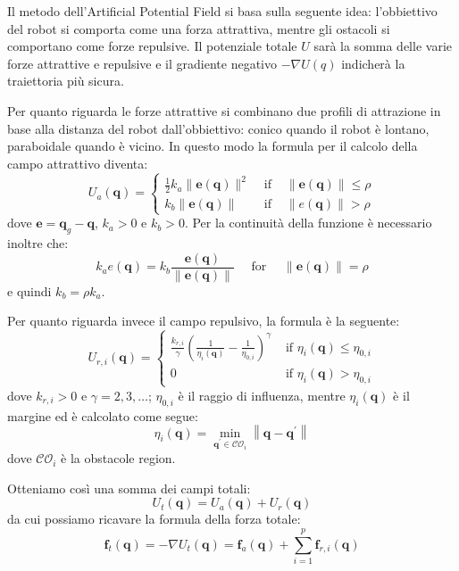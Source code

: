 \documentclass[Lau, binding=0.6cm, oneside]{sapthesis}
\begin{document}
Il metodo dell'Artificial Potential Field si basa sulla seguente idea: l'obbiettivo del robot si comporta come una forza attrattiva, mentre gli ostacoli si comportano come forze repulsive.
Il potenziale totale $U$ sarà la somma delle varie forze attrattive e repulsive e il gradiente negativo $-\nabla U(q)$ indicherà la traiettoria più sicura.

Per quanto riguarda le forze attrattive si combinano due profili di attrazione in base alla distanza del robot dall'obbiettivo: conico quando il robot è lontano, paraboidale quando è vicino.
In questo modo la formula per il calcolo della campo attrattivo diventa:
\newline
$$
U_{a}(\boldsymbol{q})=\left\{\begin{array}{cll}
\frac{1}{2} k_{a}\|\boldsymbol{e}(\boldsymbol{q})\|^{2} & \text { if } & \|\boldsymbol{e}(\boldsymbol{q})\| \leq \rho \\
k_{b}\|\boldsymbol{e}(\boldsymbol{q})\| & \text { if } & \|e(\boldsymbol{q})\|>\rho
\end{array}\right.
$$
\newline
dove $\boldsymbol{e}=\boldsymbol{q}_{g}-\boldsymbol{q}$, $k_{a}>0$ e $k_{b}>0$.
Per la continuità della funzione è necessario inoltre che:
$$
k_{a} e(\boldsymbol{q})=k_{b} \frac{\boldsymbol{e}(\boldsymbol{q})}{\|\boldsymbol{e}(\boldsymbol{q})\|} \quad \text { for } \quad\|\boldsymbol{e}(\boldsymbol{q})\|=\rho
$$
\newline
e quindi $k_{b}=\rho k_{a}$.

Per quanto riguarda invece il campo repulsivo, la formula è la seguente:
\newline
$$
U_{r, i}(\boldsymbol{q})=\left\{\begin{array}{ll}
\frac{k_{r, i}}{\gamma}\left(\frac{1}{\eta_{i}(\boldsymbol{q})}-\frac{1}{\eta_{0, i}}\right)^{\gamma} & \text { if } \eta_{i}(\boldsymbol{q}) \leq \eta_{0, i} \\
0 & \text { if } \eta_{i}(\boldsymbol{q})>\eta_{0, i}
\end{array}\right.
$$
\newline
dove $k_{r, i}>0$ e $\gamma=2,3, \ldots$; $\eta_{0, i}$ è il raggio di influenza, mentre $\eta_{i}(\boldsymbol{q})$ è il margine ed è calcolato come segue:
$$
\eta_{i}(\boldsymbol{q})=\min _{\boldsymbol{q}^{\prime} \in \mathcal{C O}_{i}}\left\|\boldsymbol{q}-\boldsymbol{q}^{\prime}\right\|
$$
\newline
dove $\mathcal{C O}_{i}$ è la obstacole region.

Otteniamo così una somma dei campi totali:
$$
U_{t}(\boldsymbol{q})=U_{a}(\boldsymbol{q})+U_{r}(\boldsymbol{q})
$$
da cui possiamo ricavare la formula della forza totale:
$$
\boldsymbol{f}_{t}(\boldsymbol{q})=-\nabla U_{t}(\boldsymbol{q})=\boldsymbol{f}_{a}(\boldsymbol{q})+\sum_{i=1}^{p} \boldsymbol{f}_{r, i}(\boldsymbol{q})
$$
\cite{fonte2}
\end{document}
